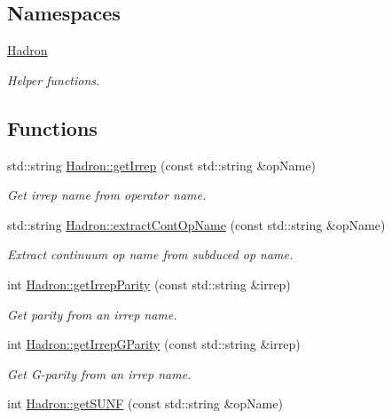 \subsection*{Namespaces}
\begin{DoxyCompactItemize}
\item 
 \mbox{\hyperlink{namespaceHadron}{Hadron}}
\begin{DoxyCompactList}\small\item\em Helper functions. \end{DoxyCompactList}\end{DoxyCompactItemize}
\subsection*{Functions}
\begin{DoxyCompactItemize}
\item 
std\+::string \mbox{\hyperlink{namespaceHadron_a33d1d1e15a13f881d974049a8ae1c3dc}{Hadron\+::get\+Irrep}} (const std\+::string \&op\+Name)
\begin{DoxyCompactList}\small\item\em Get irrep name from operator name. \end{DoxyCompactList}\item 
std\+::string \mbox{\hyperlink{namespaceHadron_a0b8fc65d4da647ad0c70885da63e157e}{Hadron\+::extract\+Cont\+Op\+Name}} (const std\+::string \&op\+Name)
\begin{DoxyCompactList}\small\item\em Extract continuum op name from subduced op name. \end{DoxyCompactList}\item 
int \mbox{\hyperlink{namespaceHadron_af182dccf3462f82247a3d86df38c2da0}{Hadron\+::get\+Irrep\+Parity}} (const std\+::string \&irrep)
\begin{DoxyCompactList}\small\item\em Get parity from an irrep name. \end{DoxyCompactList}\item 
int \mbox{\hyperlink{namespaceHadron_a951cfb9d3a3b24aaf558d2e22513cec1}{Hadron\+::get\+Irrep\+G\+Parity}} (const std\+::string \&irrep)
\begin{DoxyCompactList}\small\item\em Get G-\/parity from an irrep name. \end{DoxyCompactList}\item 
int \mbox{\hyperlink{namespaceHadron_a61e330de82814218612462c430ceaeb9}{Hadron\+::get\+S\+U\+NF}} (const std\+::string \&op\+Name)

\end{DoxyCompactItemize}
